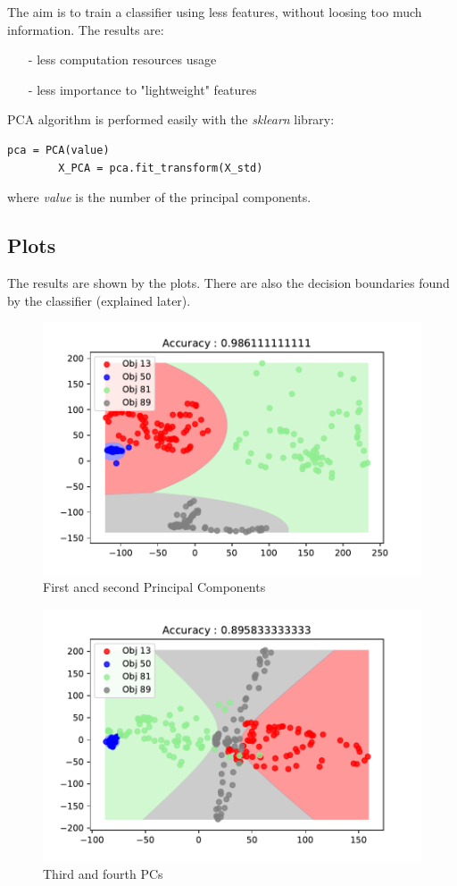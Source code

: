 \documentclass[10pt,a4paper]{article}
\begin{document}
	The aim is to train a classifier using less features, without loosing too much information. The results are:
	\begin{itemize}
		\item[-] less computation resources usage
		\item[-] less importance to "lightweight" features
	\end{itemize}
	PCA algorithm is performed easily with the \emph{sklearn} library:
	\begin{Verbatim}[obeytabs, tabsize=4]
		pca = PCA(value)
		X_PCA = pca.fit_transform(X_std)
	\end{Verbatim}	
	where \emph{value} is the number of the principal components.
	
	\subsection*{Plots}
	
	The results are shown by the plots. There are also the decision boundaries found by the classifier (explained later).
	
	\begin{figure}[ph]
	\centering
	\includegraphics[width=0.7\linewidth]{../HW1/PCA2}
	\caption{First ancd second Principal Components}
	\label{fig:PCA2}
	\end{figure}

	\begin{figure}[ph]
	\centering
	\includegraphics[width=0.7\linewidth]{../HW1/PCA4}
	\caption{Third and fourth PCs}
	\label{fig:PCA4}
	\end{figure}
	
\end{document}
